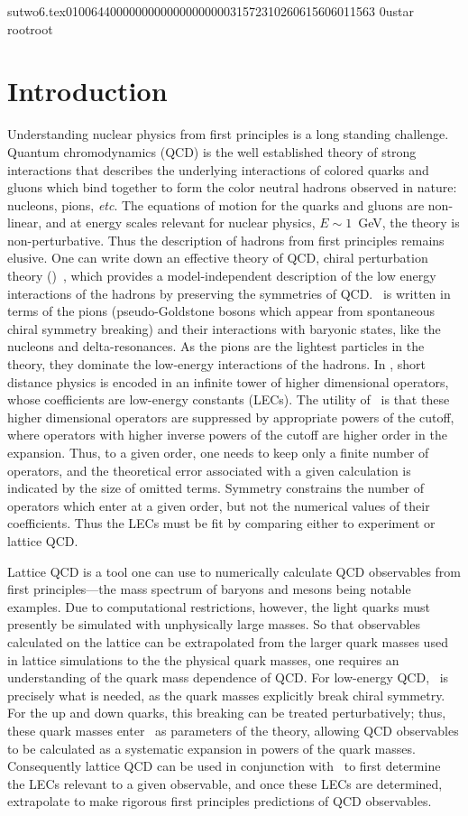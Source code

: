                                                                                                                                                                                                                                                                                       sutwo6.tex                                                                                          0100644 0000000 0000000 00000315723 10260615606 011563  0                                                                                                    ustar   root                            root                                                                                                                                                                                                                   \documentclass[prd,amssymb,amsmath,showpacs,nofootinbib,superscriptaddress]{revtex4}
\begin{document}
\section{Introduction}
Understanding nuclear physics from first principles is
a long standing challenge.  Quantum chromodynamics (QCD)
is the well established theory of strong interactions that
describes the underlying interactions of colored quarks and gluons which bind
together to form the color neutral hadrons observed in nature:
nucleons, pions, \emph {etc}.  The equations of motion for the quarks and
gluons are non-linear, and at energy scales relevant for nuclear
physics, $E \sim 1$~GeV, the theory is non-perturbative.  Thus the description of
hadrons from first principles remains elusive.  One can
write down an effective theory of QCD, chiral perturbation
theory (\CPT)~\cite{Gasser:1983yg}, which provides a model-independent
description of the low energy interactions of the hadrons by
preserving the symmetries of QCD.  \CPT\ is written in terms of the
pions (pseudo-Goldstone bosons which appear from spontaneous chiral
symmetry breaking) and their interactions with baryonic states, 
like the nucleons and delta-resonances.
As the pions are the lightest particles in the theory, they 
dominate the low-energy interactions of the hadrons.
In \CPT, short distance physics is encoded in an infinite tower of
higher dimensional operators, whose coefficients are low-energy
constants (LECs).  The utility of \CPT\ is that these higher
dimensional operators are suppressed by appropriate powers of the
cutoff, where operators with higher inverse powers of the cutoff are
higher order in 
the expansion.  Thus, to a given order, one needs to keep only a
finite number of operators, 
and the theoretical error associated with a given calculation is
indicated by the size of omitted terms.
Symmetry constrains the number of operators which
enter at a given order, but not the numerical values of their
coefficients.  Thus the LECs must be fit by comparing either
to experiment or lattice QCD.

Lattice QCD is a tool one can use to
numerically calculate QCD observables from first principles---the mass
spectrum of baryons and mesons being notable examples.  Due
to computational restrictions, however, the light quarks must presently be
simulated with unphysically large masses.  So that observables
calculated on the lattice can be extrapolated from the larger quark
masses used in lattice simulations to the the physical quark 
masses,  one requires an understanding of the quark mass dependence of
QCD.  For low-energy QCD, \CPT\ is precisely what is
needed, as the quark masses explicitly break chiral
symmetry.  For the up and down quarks, this breaking can be treated
perturbatively; thus, these quark masses enter \CPT\ as parameters of
the theory, allowing QCD observables to be calculated as a systematic
expansion in powers of the quark masses.  Consequently lattice QCD can be used
in conjunction with \CPT\ to first determine the LECs relevant to a
given observable, and once these LECs are determined, extrapolate to
make rigorous first principles predictions of QCD observables.
\end{document}
